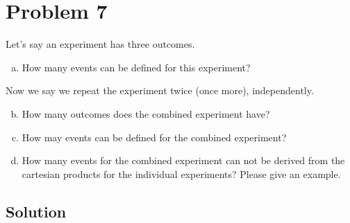 \section{Problem 7}
Let's say an experiment has three outcomes.

\begin{enumerate}[a.]
	\item How many events can be defined for this experiment?
\end{enumerate}

	
Now we say we repeat the experiment twice (once more), independently.

\begin{enumerate}[a.]\setcounter{enumi}{1}
	\item How many outcomes does the combined experiment have?
	\item How may events can be defined for the combined experiment?
	\item How many events for the combined experiment can not be derived from the cartesian products for the individual experiments? Please give an example.
\end{enumerate}
\subsection{Solution}